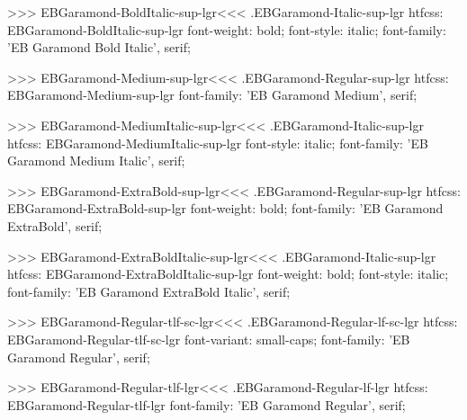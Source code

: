 >>>
\<EBGaramond-BoldItalic-sup-lgr\><<<
.EBGaramond-Italic-sup-lgr
htfcss:  EBGaramond-BoldItalic-sup-lgr  font-weight: bold; font-style: italic; font-family: 'EB Garamond Bold Italic', serif;

>>>
\<EBGaramond-Medium-sup-lgr\><<<
.EBGaramond-Regular-sup-lgr
htfcss:  EBGaramond-Medium-sup-lgr  font-family: 'EB Garamond Medium', serif;

>>>
\<EBGaramond-MediumItalic-sup-lgr\><<<
.EBGaramond-Italic-sup-lgr
htfcss:  EBGaramond-MediumItalic-sup-lgr  font-style: italic; font-family: 'EB Garamond Medium Italic', serif;

>>>
\<EBGaramond-ExtraBold-sup-lgr\><<<
.EBGaramond-Regular-sup-lgr
htfcss:  EBGaramond-ExtraBold-sup-lgr  font-weight: bold; font-family: 'EB Garamond ExtraBold', serif;

>>>
\<EBGaramond-ExtraBoldItalic-sup-lgr\><<<
.EBGaramond-Italic-sup-lgr
htfcss:  EBGaramond-ExtraBoldItalic-sup-lgr  font-weight: bold; font-style: italic; font-family: 'EB Garamond ExtraBold Italic', serif;

>>>
\<EBGaramond-Regular-tlf-sc-lgr\><<<
.EBGaramond-Regular-lf-sc-lgr
htfcss:  EBGaramond-Regular-tlf-sc-lgr  font-variant: small-caps; font-family: 'EB Garamond Regular', serif;

>>>
\<EBGaramond-Regular-tlf-lgr\><<<
.EBGaramond-Regular-lf-lgr
htfcss:  EBGaramond-Regular-tlf-lgr  font-family: 'EB Garamond Regular', serif;

